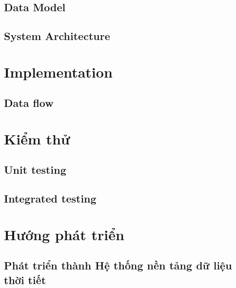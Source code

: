 \documentclass[12pt, a4paper]{report}
\theoremstyle{definition}
\begin{document}
\section{Data Model}

\section{System Architecture}


\newpage
\chapter{Implementation}
\section{Data flow}



\chapter{Kiểm thử}
\section{Unit testing}

\section{Integrated testing}


\newpage
\chapter{Hướng phát triển}
\section*{Phát triển thành Hệ thống nền tảng dữ liệu thời tiết}




\end{document}
